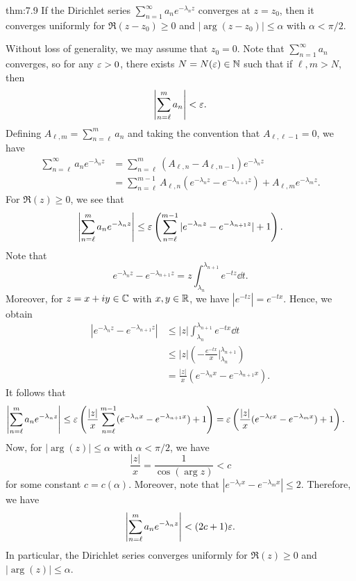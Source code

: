 \begin{theo}{thm:7.9} 
    If the Dirichlet series $\sum_{n=1}^\infty a_n e^{-\lambda_n z}$ converges 
    at $z = z_0$, then it converges uniformly for $\Re(z-z_0) \geq 0$ and 
    $\lvert\arg(z-z_0)\rvert \leq \alpha$ with $\alpha < \pi/2$. 
\end{theo}
\begin{pf}
    Without loss of generality, we may assume that $z_0 = 0$. Note that 
    $\sum_{n=1}^\infty a_n$ converges, so for any $\varepsilon > 0$, there exists 
    $N = N(\varepsilon) \in \mathbb{N}$ such that if $\ell, m > N$, then 
    \[ \left| \sum_{n=\ell}^m a_n \right| < \varepsilon. \] 
    Defining $A_{\ell,m} = \sum_{n=\ell}^m a_n$ and taking the convention that 
    $A_{\ell,\ell-1} = 0$, we have 
    \begin{align*}
        \sum_{n=\ell}^\infty a_n e^{-\lambda_n z}
        &= \sum_{n=\ell}^m (A_{\ell,n} - A_{\ell,n-1}) e^{-\lambda_n z} \\ 
        &= \sum_{n=\ell}^{m-1} A_{\ell,n} (e^{-\lambda_n z} - e^{-\lambda_{n+1}z})
        + A_{\ell,m} e^{-\lambda_m z}. 
    \end{align*}
    For $\Re(z) \geq 0$, we see that 
    \[ \left| \sum_{n=\ell}^m a_n e^{-\lambda_n z} \right| 
    \leq \varepsilon \left( \sum_{n=\ell}^{m-1} |e^{-\lambda_n z} - e^{-\lambda_{n+1}z}| 
    + 1 \right). \] 
    Note that 
    \[ e^{-\lambda_n z} - e^{-\lambda_{n+1}z} = z \int_{\lambda_n}^{\lambda_{n+1}} 
    e^{-tz}\dd t. \] 
    Moreover, for $z = x+iy \in \mathbb{C}$ with $x, y \in \mathbb{R}$, we have $|e^{-tz}| = 
    e^{-tx}$. Hence, we obtain 
    \begin{align*}
        |e^{-\lambda_n z} - e^{-\lambda_{n+1}z}|
        &\leq |z| \int_{\lambda_n}^{\lambda_{n+1}} e^{-tx}\dd t \\ 
        &\leq |z| \left( -\frac{e^{-tx}}{x} \bigg|_{\lambda_n}^{\lambda_{n+1}}
        \right) \\ 
        &= \frac{|z|}{x} (e^{-\lambda_n x} - e^{-\lambda_{n+1}x}). 
    \end{align*}
    It follows that 
    \begin{align*}
        \left| \sum_{n=\ell}^m a_n e^{-\lambda_n z} \right| 
        &\leq \varepsilon \left( \frac{|z|}{x} \sum_{n=\ell}^{m-1} (e^{-\lambda_n x} 
        - e^{-\lambda_{n+1}x}) + 1 \right) 
        = \varepsilon \left( \frac{|z|}{x} (e^{-\lambda_\ell x} - e^{-\lambda_m x})
        + 1 \right). 
    \end{align*}
    Now, for $\lvert\arg(z)\rvert \leq \alpha$ with $\alpha < \pi/2$, we have 
    \[ \frac{|z|}{x} = \frac{1}{\cos(\arg z)} < c \] 
    for some constant $c = c(\alpha)$. Moreover, note that $|e^{-\lambda_\ell x} 
    - e^{-\lambda_m x}| \leq 2$. Therefore, we have 
    \[ \left| \sum_{n=\ell}^m a_n e^{-\lambda_n z} \right| < (2c + 1)\varepsilon. \] 
    In particular, the Dirichlet series converges uniformly for $\Re(z) \geq 0$ 
    and $\lvert\arg(z)\rvert \leq \alpha$. 
\end{pf}

